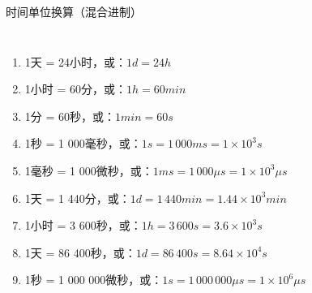\documentclass[aspectratio=169]{ctexbeamer} %
\begin{document}
\begin{frame}[t]{时间单位换算（混合进制）}
\begin{columns}
\begin{enumerate}[label={\Alph*.}]
\item 1天 = 24小时，或：$1 d = 24 h$ \pause
\item 1小时 = 60分，或：$1 h = 60 min$ \pause
\item 1分 = 60秒，或：$1 min = 60 s$ \pause
\item 1秒 = 1 000毫秒，或：$1 s = 1 \, 000 ms = 1 \times 10^{3} s$ \pause
\item 1毫秒 = 1 000微秒，或：$1 ms = 1 \, 000 \mu s = 1 \times 10^{3} \mu s$ \pause
\item 1天 = 1 440分，或：$1 d = 1 \, 440 min = 1.44 \times 10^{3} min$ \pause
\item 1小时 = 3 600秒，或：$1 h = 3 \, 600 s = 3.6 \times 10^{3} s$ \pause
\item 1天 = 86 400秒，或：$1 d = 86 \, 400 s = 8.64 \times 10^{4} s$ \pause
\item 1秒 = 1 000 000微秒，或：$1 s = 1 \, 000 \, 000 \mu s = 1 \times 10^{6} \mu s$ \pause
\pause
\pause
\end{enumerate}
\end{columns}
\end{frame}
\end{document}
